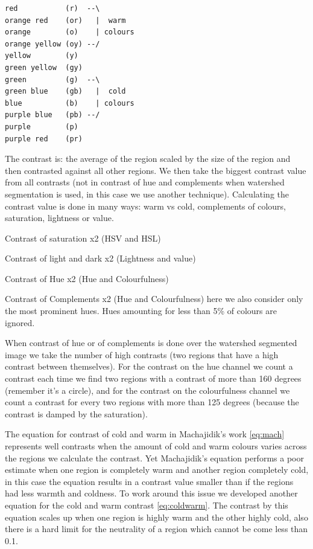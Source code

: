 \documentclass[11pt,a4paper,draft]{report}
\begin{document}
\begin{multicols}{2}
\begin{verbatim}
red           (r)  --\
orange red    (or)   |  warm
orange        (o)    | colours
orange yellow (oy) --/
yellow        (y)
green yellow  (gy)
green         (g)  --\
green blue    (gb)   |  cold
blue          (b)    | colours
purple blue   (pb) --/
purple        (p)
purple red    (pr)
\end{verbatim}


The contrast is: the average of the region scaled by the size of the region and
then contrasted against all other regions.  We then take the biggest contrast
value from all contrasts (not in contrast of hue and complements when watershed
segmentation is used, in this case we use another technique).  Calculating the
contrast value is done in many ways: warm vs cold, complements of colours,
saturation, lightness or value.

Contrast of saturation x2 (HSV and HSL)

Contrast of light and dark x2 (Lightness and value)

Contrast of Hue x2 (Hue and Colourfulness)

Contrast of Complements x2 (Hue and Colourfulness) here we also consider only
the most prominent hues.  Hues amounting for less than 5\% of colours are
ignored.

When contrast of hue or of complements is done over the watershed segmented
image we take the number of high contrasts (two regions that have a high
contrast between themselves).  For the contrast on the hue channel we count a
contrast each time we find two regions with a contrast of more than 160 degrees
(remember it's a circle), and for the contrast on the colourfulness channel we
count a contrast for every two regions with more than 125 degrees (because the
contrast is damped by the saturation).

The equation for contrast of cold and warm in Machajidik's work \ref{eq:mach}
represents well contrasts when the amount of cold and warm colours varies
across the regions we calculate the contrast.  Yet Machajidik's equation
performs a poor estimate when one region is completely warm and another region
completely cold, in this case the equation results in a contrast value smaller
than if the regions had less warmth and coldness.  To work around this issue we
developed another equation for the cold and warm contrast \ref{eq:coldwarm}.
The contrast by this equation scales up when one region is highly warm and the
other highly cold, also there is a hard limit for the neutrality of a region
which cannot be come less than 0.1.


\end{multicols}
\end{document}
